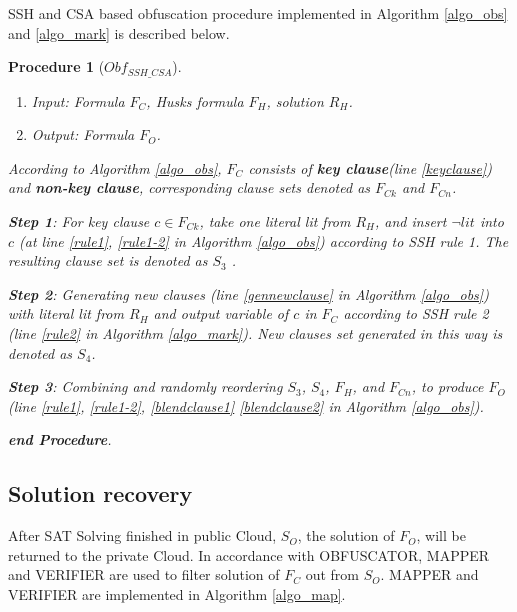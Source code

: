 \documentclass[conference,compsocconf]{IEEEtran}
\newtheorem{Procedure}{\textbf{Procedure}}
\begin{document}
SSH and CSA based obfuscation procedure implemented in Algorithm \ref{algo_obs} and \ref{algo_mark} is described below.
\begin{Procedure}[${Obf_{SSH\_CSA}}$]\label{obsprocedure}~
\begin{enumerate}
\item Input:
Formula $F_C$, Husks formula $F_H$, solution $R_H$.
\item Output:
Formula $F_O$.
\end{enumerate}
According to Algorithm \ref{algo_obs}, 
$F_C$ consists of \textbf{key clause}(line \ref{keyclause}) and \textbf{non-key clause}, 
corresponding clause sets denoted as \textbf{$F_{Ck}$} and \textbf{$F_{Cn}$}.

\textbf{Step 1}: 
For key clause $c\in F_{Ck}$, 
take one literal lit from $R_H$, 
and insert $\neg lit$ into $c$ (at line \ref{rule1}, \ref{rule1-2} in Algorithm \ref{algo_obs})  according to  SSH rule 1.
The resulting clause set is denoted as $S_3$ .

\textbf{Step 2}: 
Generating new clauses  (line \ref{gennewclause} in Algorithm \ref{algo_obs}) with literal lit from $R_H$ and output variable of $c$ in $F_C$ according to SSH rule 2 (line \ref{rule2} in Algorithm \ref{algo_mark}).
New clauses set generated in this way is denoted as $S_4$.

\textbf{Step 3}: 
Combining and randomly reordering $S_3$, $S_4$, $F_H$, and $F_{Cn}$, to produce $F_O$ (line \ref{rule1}, \ref{rule1-2}, \ref{blendclause1} \ref{blendclause2} in Algorithm \ref{algo_obs}).

\textit{\textbf{end Procedure}}.
\end{Procedure}

\subsection{Solution recovery}\label{mappping}
After SAT Solving finished in public Cloud, $S_O$, 
the solution of $F_O$, will be returned to the private Cloud.
In accordance with OBFUSCATOR, 
MAPPER and VERIFIER are used to filter solution of $F_C$ out from  $S_O$.
MAPPER and VERIFIER are implemented in Algorithm \ref{algo_map}.
\end{document}
